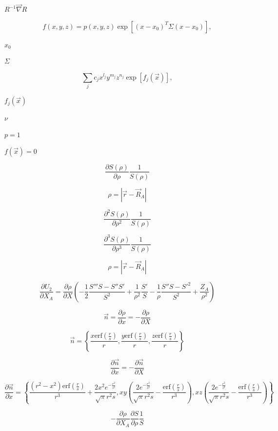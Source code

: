 \documentclass{article}
\begin{document}
$R^{-1} \vec\nabla R$
\pagebreak

\[
f(x,y,z) = p(x,y,z) \exp[(x-x_0)^T \Sigma (x-x_0)],
\]
\pagebreak

$x_0$
\pagebreak

$\Sigma$
\pagebreak

\[
\sum_j c_j x^{l_j} y^{m_j} z^{n_j} \exp[f_j(\vec{x})],
\]
\pagebreak

$f_j(\vec{x})$
\pagebreak

$\nu$
\pagebreak

$p=1$
\pagebreak

$f(\vec{x})=0$
\pagebreak

\[
    \frac{\partial S(\rho)}{\partial \rho} \frac{1}{S(\rho)}
\]
\pagebreak

\[
   \rho = |\vec r - \vec R_A |
\]
\pagebreak

\[
    \frac{\partial^2 S(\rho)}{\partial \rho^2} \frac{1}{S(\rho)}
\]
\pagebreak

\[
    \frac{\partial^3 S(\rho)}{\partial \rho^3} \frac{1}{S(\rho)}
\]
\pagebreak

\[
  \rho = \left| \vec r- \vec R_A \right|
\]
\pagebreak

\[
\frac{\partial U_2}{\partial X_A} = \frac{\partial \rho}{\partial X}
          \left(-\frac{1}{2}\frac{S''' S - S'' S'}{S^2} + \frac{1}{\rho^2}\frac{S'}{S}
          - \frac{1}{\rho} \frac{S''S - S'^2}{S^2} + \frac{Z_A}{\rho^2}\right)
\]
\pagebreak

\[
    \vec n  = \frac{\partial \rho}{\partial x} = -\frac{\partial \rho}{\partial X}
\]
\pagebreak

\[
\vec n = \left\{\frac{x \mathrm{erf}\left(\frac{r}{s}\right)}{r},
         \frac{y \mathrm{erf}\left(\frac{r}{s}\right)}{r},
         \frac{z \mathrm{erf}\left(\frac{r}{s}\right)}{r}\right\}
\]
\pagebreak

\[
    \frac{\partial \vec n}{\partial x}  = -\frac{\partial \vec n}{\partial X}
\]
\pagebreak

\[
\frac{\partial\vec n}{\partial x} =
\left\{\frac{\left(r^2-x^2\right) \mathrm{erf}\left(\frac{r}{s}\right)}{r^3}
   +\frac{2 x^2 e^{-\frac{r^2}{s^2}}}{\sqrt{\pi } r^2 s},
 x y \left(\frac{2 e^{-\frac{r^2}{s^2}}}{\sqrt{\pi } r^2 s}
   -\frac{\mathrm{erf}\left(\frac{r}{s}\right)}{r^3}\right),
 x z \left(\frac{2 e^{-\frac{r^2}{s^2}}}{\sqrt{\pi } r^2 s}
   -\frac{\mathrm{erf}\left(\frac{r}{s}\right)}{r^3}\right)\right\}
\]
\pagebreak

\[
 -\frac{\partial \rho}{\partial X_A}\frac{\partial S}{\partial \rho}\frac{1}{S}
\]
\pagebreak
\end{document}
